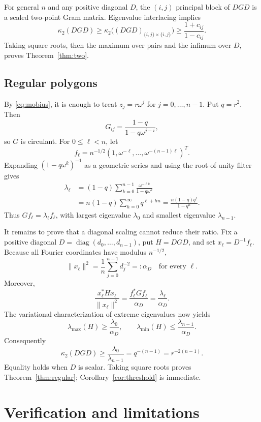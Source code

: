 \documentclass[11pt]{article}
\newcommand{\diag}{\operatorname{diag}}
\newcommand{\cond}{\kappa_2}
\begin{document}
For general $n$ and any positive diagonal $D$, the $(i,j)$ principal block of
$DGD$ is a scaled two-point Gram matrix.  Eigenvalue interlacing implies
\[
 \cond(DGD)\geq
 \cond\big((DGD)_{\{i,j\}\times\{i,j\}}\big)
 \geq\frac{1+c_{ij}}{1-c_{ij}}.
\]
Taking square roots, then the maximum over pairs and the infimum over $D$,
proves Theorem~\ref{thm:two}.

\subsection{Regular polygons}

By \eqref{eq:mobius}, it is enough to treat $z_j=r\omega^j$ for
$j=0,\dots,n-1$.  Put $q=r^2$.  Then
\begin{equation}\label{eq:circulant}
 G_{ij}=\frac{1-q}{1-q\omega^{j-i}},
\end{equation}
so $G$ is circulant.  For $0\leq\ell<n$, let
\[
 f_\ell=n^{-1/2}(1,\omega^{-\ell},\dots,
 \omega^{-(n-1)\ell})^T.
\]
Expanding $(1-q\omega^k)^{-1}$ as a geometric series and using the
root-of-unity filter gives
\begin{align*}
 \lambda_\ell
 &=(1-q)\sum_{k=0}^{n-1}\frac{\omega^{-\ell k}}
 {1-q\omega^k}\\
 &=n(1-q)\sum_{h=0}^{\infty}q^{\ell+hn}
 =\frac{n(1-q)q^\ell}{1-q^n}.
\end{align*}
Thus $Gf_\ell=\lambda_\ell f_\ell$, with largest eigenvalue $\lambda_0$
and smallest eigenvalue $\lambda_{n-1}$.

It remains to prove that a diagonal scaling cannot reduce their ratio.  Fix a
positive diagonal $D=\diag(d_0,\dots,d_{n-1})$, put $H=DGD$, and set
$x_\ell=D^{-1}f_\ell$.  Because all Fourier coordinates have modulus
$n^{-1/2}$,
\[
 \|x_\ell\|^2=\frac1n\sum_{j=0}^{n-1}d_j^{-2}=:\alpha_D
 \quad\text{for every }\ell.
\]
Moreover,
\[
 \frac{x_\ell^*Hx_\ell}{\|x_\ell\|^2}
 =\frac{f_\ell^*Gf_\ell}{\alpha_D}
 =\frac{\lambda_\ell}{\alpha_D}.
\]
The variational characterization of extreme eigenvalues now yields
\[
 \lambda_{\max}(H)\geq\frac{\lambda_0}{\alpha_D},
 \qquad
 \lambda_{\min}(H)\leq\frac{\lambda_{n-1}}{\alpha_D}.
\]
Consequently
\[
 \cond(DGD)\geq\frac{\lambda_0}{\lambda_{n-1}}
 =q^{-(n-1)}=r^{-2(n-1)}.
\]
Equality holds when $D$ is scalar.  Taking square roots proves
Theorem~\ref{thm:regular}; Corollary~\ref{cor:threshold} is immediate.

\section{Verification and limitations}
\end{document}
